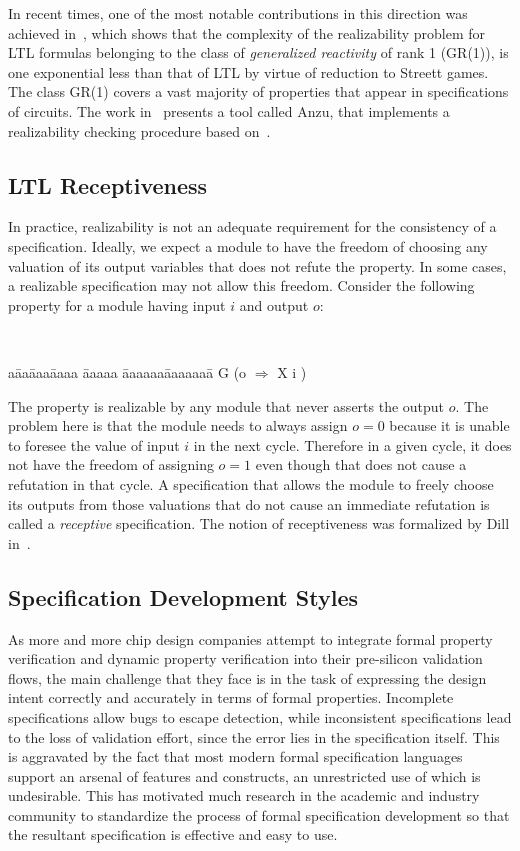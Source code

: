 \noindent
In recent times, one of the most notable contributions in this direction
was achieved in~\cite{nir}, which shows that the complexity of the
realizability problem for LTL formulas 
belonging to the class of {\em generalized reactivity} of rank 1 (GR(1)),
is one exponential less than that of LTL by virtue of reduction to
Streett games. The class GR(1) covers a vast majority of
properties that appear in specifications of circuits.  The work
in~\cite{jobst} presents a tool called Anzu, that implements
a realizability checking procedure based on~\cite{nir}.

\subsection{LTL Receptiveness} \label{sec2.2.3}
\noindent
In practice, realizability is not an adequate requirement for the
consistency of a specification. Ideally, we expect a module to have
the freedom of choosing any valuation of its output variables that does not
refute the property. In some cases, a realizable specification may not
allow this freedom. Consider the following property for a module
having input $i$ and output $o$:
{\tt
\begin{tabbing}
a\= aa\= aaa\= aaaa \= aaaaa \= aaaaaa\= aaaaaaa\= \kill
\>\>\>\>\>\>\> G (o $\Rightarrow$  X i )
\end{tabbing}
}
\noindent
The property is realizable by any module that never asserts the output $o$.
The problem here is that the module needs to always assign $o=0$ because it
is unable to foresee the value of input $i$ in the next cycle. Therefore in
a given cycle, it does not have the freedom of assigning $o=1$ even though
that does not cause a refutation in that cycle. A specification that allows
the module to freely choose its outputs from those valuations that do not
cause an immediate refutation is called a {\em receptive} specification.
The notion of receptiveness was formalized by Dill in~\cite{dill:89}.

\subsection{Specification Development Styles} \label{sec2.1.6}
As more and more chip design companies attempt to integrate formal
property verification and dynamic property verification
into their pre-silicon validation flows, the main challenge that they
face is in the task of expressing the design intent correctly and
accurately in terms of formal properties. Incomplete specifications allow
bugs to escape detection, while inconsistent specifications lead to the
loss of validation effort, since the error lies in the specification itself.
This is aggravated by the fact that most modern formal specification
languages support an arsenal of features and constructs, an unrestricted
use of which is undesirable.
This has motivated much research in the academic and industry community
to standardize the process of formal specification development so that the
resultant specification is effective and easy to use. 

